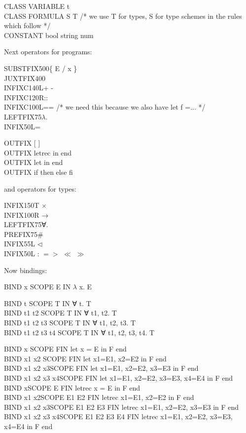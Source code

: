 \documentclass[11pt]{book}
\newcommand{\tab}{\hspace{5mm}}
\begin{document}
CLASS VARIABLE t\\
CLASS FORMULA S T /* we use T for types, S for type schemes in the rules which follow */\\
CONSTANT bool string num


Next operators for programs:

SUBSTFIX\tab 500\tab \{ E / x \}\\
JUXTFIX\tab 400\\
INFIXC\tab 140L\tab + -\\
INFIXC\tab 120R\tab ::\\
INFIXC\tab 100L\tab == /* we need this because we also have let f =... */\\
LEFTFIX\tab 75\tab $\lambda$.\\
INFIX\tab 50L\tab =

OUTFIX [ ]\\
OUTFIX letrec in end\\
OUTFIX let in end\\
OUTFIX if then else fi


and operators for types:

INFIX\tab 150T \tab $\times$\\
INFIX\tab 100R \tab →\\
LEFTFIX\tab 75\tab ∀.\\
PREFIX\tab 75\tab \#\\
INFIX\tab 55L \tab {\textbullet} $\triangleleft$\\
INFIX\tab 50L \tab : $=>$ $\ll$ $\gg$


Now bindings:

BIND x SCOPE E IN $\lambda$ x. E

BIND t SCOPE T IN ∀ t. T\\
BIND t1 t2 SCOPE T IN ∀ t1, t2. T\\
BIND t1 t2 t3 SCOPE T IN ∀ t1, t2, t3. T\\
BIND t1 t2 t3 t4 SCOPE T IN ∀ t1, t2, t3, t4. T

BIND x \tab SCOPE F\tab IN let x = E in F end\\
BIND x1 x2 \tab SCOPE F\tab IN let x1=E1, x2=E2 in F end\\
BIND x1 x2 x3\tab SCOPE F\tab IN let x1=E1, x2=E2, x3=E3 in F end\\
BIND x1 x2 x3 x4\tab SCOPE F\tab IN let x1=E1, x2=E2, x3=E3, x4=E4 in F end\\
BIND x\tab SCOPE E F\tab IN letrec x = E in F end\\
BIND x1 x2\tab SCOPE E1 E2 F\tab IN letrec x1=E1, x2=E2 in F end\\
BIND x1 x2 x3\tab SCOPE E1 E2 E3 F\tab IN letrec x1=E1, x2=E2, x3=E3 in F end\\
BIND x1 x2 x3 x4\tab SCOPE E1 E2 E3 E4 F\tab IN letrec x1=E1, x2=E2, x3=E3, x4=E4 in F end
\end{document}

